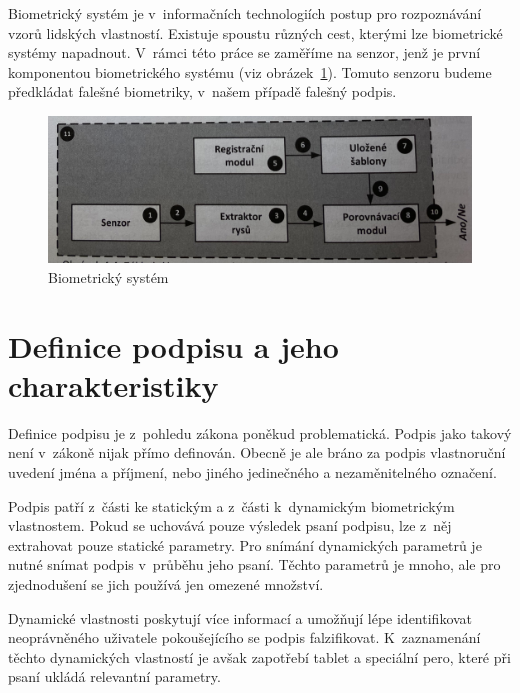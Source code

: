 Biometrický systém je v~informačních technologiích postup pro rozpoznávání vzorů lidských vlastností.       %
Existuje spoustu různých cest, kterými lze biometrické systémy napadnout.                                   %
V~rámci této práce se zaměříme na senzor, jenž je první komponentou biometrického systému (viz obrázek~\ref{fig:biometricky_system}). %
Tomuto senzoru budeme předkládat falešné biometriky, v~našem případě falešný podpis.~\cite{DrahanskýMartin2011}%

\begin{figure}[H]
  \centering
  \includegraphics[width=1\textwidth]{obrazky-figures/biometricky_system.jpg}
  \caption{Biometrický systém~\cite{DrahanskýMartin2011}}
  \label{fig:biometricky_system}
\end{figure}

\section{Definice podpisu a jeho charakteristiky}
Definice podpisu je z~pohledu zákona poněkud problematická. 
Podpis jako takový není v~zákoně nijak přímo definován. 
Obecně je ale bráno za podpis vlastnoruční uvedení jména a příjmení, nebo jiného jedinečného a nezaměnitelného označení.~\cite{Fulsoft2023} %

Podpis patří z~části ke statickým a z~části k~dynamickým biometrickým vlastnostem.
Pokud se uchovává pouze výsledek psaní podpisu, lze z~něj extrahovat pouze statické parametry.
Pro snímání dynamických parametrů je nutné snímat podpis v~průběhu jeho psaní.
Těchto parametrů je mnoho, ale pro zjednodušení se jich používá jen omezené množství.

Dynamické vlastnosti poskytují více informací a umožňují lépe identifikovat neoprávněného uživatele pokoušejícího se podpis falzifikovat.    %
K~zaznamenání těchto dynamických vlastností je avšak zapotřebí tablet a speciální pero, které při psaní ukládá relevantní parametry.~\cite{DrahanskýMartin2011}  %
\newline

